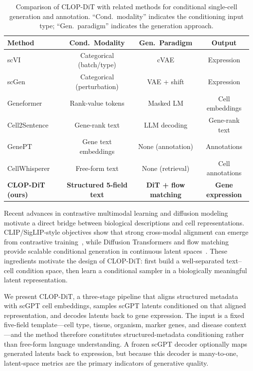 \documentclass[genes,article,submit,pdftex,oneauthor]{Definitions/mdpi}
\begin{document}
\begin{table}[!htbp]
\caption{Comparison of CLOP-DiT with related methods for conditional single-cell generation and annotation. ``Cond.\ modality'' indicates the conditioning input type; ``Gen.\ paradigm'' indicates the generation approach.\label{tab:method-comparison}}
\centering
\small
\begin{tabular}{lccc}
\toprule
\textbf{Method} & \textbf{Cond.\ Modality} & \textbf{Gen.\ Paradigm} & \textbf{Output} \\
\midrule
scVI~\cite{ref-scvi}           & Categorical (batch/type) & cVAE               & Expression \\
scGen~\cite{ref-scgen}         & Categorical (perturbation) & VAE + shift       & Expression \\
Geneformer~\cite{ref-geneformer} & Rank-value tokens & Masked LM           & Cell embeddings \\
Cell2Sentence~\cite{ref-cell2sentence} & Gene-rank text   & LLM decoding        & Gene-rank text \\
GenePT~\cite{ref-genept}       & Gene text embeddings     & None (annotation)   & Annotations \\
CellWhisperer~\cite{ref-cellwhisperer} & Free-form text           & None (retrieval)    & Cell annotations \\
\textbf{CLOP-DiT (ours)}       & \textbf{Structured 5-field text} & \textbf{DiT + flow matching} & \textbf{Gene expression} \\
\bottomrule
\end{tabular}
\end{table}

Recent advances in contrastive multimodal learning and diffusion modeling motivate a direct bridge between biological descriptions and cell representations. CLIP/SigLIP-style objectives show that strong cross-modal alignment can emerge from contrastive training~\cite{ref-clip,ref-siglip}, while Diffusion Transformers and flow matching provide scalable conditional generation in continuous latent spaces~\cite{ref-dit,ref-flow-matching,ref-albergo-flow,ref-rectified-flow}. These ingredients motivate the design of CLOP-DiT: first build a well-separated text--cell condition space, then learn a conditional sampler in a biologically meaningful latent representation.

We present CLOP-DiT, a three-stage pipeline that aligns structured metadata with scGPT cell embeddings, samples scGPT latents conditioned on that aligned representation, and decodes latents back to gene expression. The input is a fixed five-field template---cell type, tissue, organism, marker genes, and disease context---and the method therefore constitutes structured-metadata conditioning rather than free-form language understanding. A frozen scGPT decoder optionally maps generated latents back to expression, but because this decoder is many-to-one, latent-space metrics are the primary indicators of generative quality.
\end{document}
